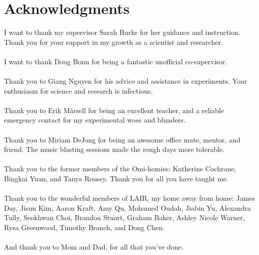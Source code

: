 
\chapter{Acknowledgments}

I want to thank my supervisor Sarah Burke for her guidance and instruction. Thank you for your support in my growth as a scientist and researcher.\\
\\
I want to thank Doug Bonn for being a fantastic unofficial co-supervisor.\\
\\
Thank you to Giang Nguyen for his advice and assistance in experiments. Your enthusiasm for science and research is infectious. \\
\\
Thank you to Erik M\aa rsell for being an excellent teacher, and a reliable emergency contact for my experimental woes and blunders.\\
\\
Thank you to Miriam DeJong for being an awesome office mate, mentor, and friend. The music blasting sessions made the rough days more tolerable.\\
\\
Thank you to the former members of the Omi-homies: Katherine Cochrane, Bingkai Yuan, and Tanya Roussy. Thank you for all you have taught me.\\
\\
Thank you to the wonderful members of LAIR, my home away from home: James Day, Jisun Kim, Aaron Kraft, Amy Qu, Mohamed Oudah, Jiabin Yu, Alexandra Tully, Seokhwan Choi, Brandon Stuart, Graham Baker, Ashley Nicole Warner, Rysa Greenwood, Timothy Branch, and Dong Chen.\\
\\
And thank you to Mom and Dad, for all that you've done.








